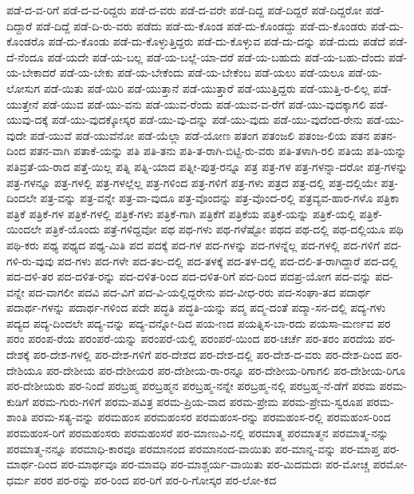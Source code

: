{ಪಡೆ-ದ-ವ-ರಿಗೆ
ಪಡೆ-ದ-ವ-ರಿದ್ದರು
ಪಡೆ-ದ-ವರು
ಪಡೆ-ದ-ವರೇ
ಪಡೆ-ದಿದ್ದ
ಪಡೆ-ದಿದ್ದರೆ
ಪಡೆ-ದಿದ್ದರೋ
ಪಡೆ-ದಿದ್ದಾರೆ
ಪಡೆ-ದಿದ್ದೆ
ಪಡೆ-ದಿ-ರು-ವರು
ಪಡೆದು
ಪಡೆ-ದು-ಕೊಂಡ
ಪಡೆ-ದು-ಕೊಂಡದ್ದು
ಪಡೆ-ದು-ಕೊಂಡರು
ಪಡೆ-ದು-ಕೊಂಡರೊ
ಪಡೆ-ದು-ಕೊಂಡು
ಪಡೆ-ದು-ಕೊಳ್ಳುತ್ತಿದ್ದರು
ಪಡೆ-ದು-ಕೊಳ್ಳುವ
ಪಡೆ-ದು-ದನ್ನು
ಪಡೆ-ದುದು
ಪಡೆದೆ
ಪಡೆ-ದೆ-ನೆಂದೂ
ಪಡೆ-ಯದೇ
ಪಡೆ-ಯ-ಬಲ್ಲ
ಪಡೆ-ಯ-ಬಲ್ಲೆ-ಯಾ-ದರೆ
ಪಡೆ-ಯ-ಬಹುದು
ಪಡೆ-ಯ-ಬಹು-ದೆಂದು
ಪಡೆ-ಯ-ಬೇಕಾದರೆ
ಪಡೆ-ಯ-ಬೇಕು
ಪಡೆ-ಯ-ಬೇಕೆಂದು
ಪಡೆ-ಯ-ಬೇಕೆಂಬ
ಪಡೆ-ಯಲು
ಪಡೆ-ಯಲೂ
ಪಡೆ-ಯ-ಲೋಸುಗ
ಪಡೆ-ಯಿತು
ಪಡೆ-ಯಿರಿ
ಪಡೆ-ಯುತ್ತಾನೆ
ಪಡೆ-ಯುತ್ತಾರೆ
ಪಡೆ-ಯುತ್ತಿದ್ದರು
ಪಡೆ-ಯುತ್ತಿ-ರ-ಲಿಲ್ಲ
ಪಡೆ-ಯುತ್ತೇನೆ
ಪಡೆ-ಯುವ
ಪಡೆ-ಯು-ವನು
ಪಡೆ-ಯುವ-ರೆಂದು
ಪಡೆ-ಯುವ-ವ-ರೆಗೆ
ಪಡೆ-ಯು-ವುದಕ್ಕಾಗಲಿ
ಪಡೆ-ಯುವು-ದಕ್ಕೆ
ಪಡೆ-ಯು-ವುದಕ್ಕೋಸ್ಕರ
ಪಡೆ-ಯು-ವು-ದನ್ನು
ಪಡೆ-ಯು-ವುದು
ಪಡೆ-ಯು-ವುದೆಂದ-ರೇನು
ಪಡೆ-ಯು-ವುದೇ
ಪಡೆ-ಯುವೆ
ಪಡೆ-ಯುವೆನೋ
ಪಡೆ-ಯೆಲ್ಲಾ
ಪಡೆ-ಯೋಣ
ಪತಂಗ
ಪತಂಜಲಿ
ಪತಂಜ-ಲಿಯ
ಪತನ
ಪತನ-ದಿಂದ
ಪತನ-ವಾಗಿ
ಪತಾಕೆ-ಯನ್ನು
ಪತಿ
ಪತಿ-ತನು
ಪತಿ-ತ-ರಾಗಿ-ಬಿಟ್ಟಿ-ರು-ವರು
ಪತಿ-ತಳಾಗಿ-ರಲಿ
ಪತಿಯ
ಪತಿ-ಯನ್ನು
ಪತಿವ್ರತೆ-ಯ-ರಾದ
ಪತ್ತೆ-ಯಿಲ್ಲ
ಪತ್ನಿ
ಪತ್ನಿ-ಯಾದ
ಪತ್ನೀ-ಪುತ್ರ-ರನ್ನೂ
ಪತ್ರ
ಪತ್ರ-ಗಳ
ಪತ್ರ-ಗಳನ್ನಾ-ದರೋ
ಪತ್ರ-ಗಳನ್ನು
ಪತ್ರ-ಗಳನ್ನೂ
ಪತ್ರ-ಗಳಲ್ಲಿ
ಪತ್ರ-ಗಳಲ್ಲೆಲ್ಲ
ಪತ್ರ-ಗಳಿಂದ
ಪತ್ರ-ಗಳಿಗೆ
ಪತ್ರ-ಗಳು
ಪತ್ರದ
ಪತ್ರ-ದಲ್ಲಿ
ಪತ್ರ-ದಲ್ಲಿಯೇ
ಪತ್ರ-ದಿಂದಲೇ
ಪತ್ರ-ವನ್ನು
ಪತ್ರ-ವನ್ನೇ
ಪತ್ರ-ವಾ-ವುದೂ
ಪತ್ರ-ವೊಂದನ್ನು
ಪತ್ರ-ವೊಂದ-ರಲ್ಲಿ
ಪತ್ರವ್ಯವ-ಹಾರ-ಗಳೊ
ಪತ್ರಿಕಾ
ಪತ್ರಿಕೆ
ಪತ್ರಿಕೆ-ಗಳ
ಪತ್ರಿಕೆ-ಗಳಲ್ಲಿ
ಪತ್ರಿಕೆ-ಗಳು
ಪತ್ರಿಕೆ-ಗಾಗಿ
ಪತ್ರಿಕೆಗೆ
ಪತ್ರಿಕೆಯ
ಪತ್ರಿಕೆ-ಯನ್ನು
ಪತ್ರಿಕೆ-ಯಲ್ಲಿ
ಪತ್ರಿಕೆ-ಯಿಂದಲೇ
ಪತ್ರಿಕೆ-ಯೊಂದು
ಪತ್ರೆ-ಗಳಿದ್ದವೋ
ಪಥ
ಪಥ-ಗಳು
ಪಥ-ಗಳೆಷ್ಟೋ
ಪಥದ
ಪಥ-ದಲ್ಲಿ
ಪಥ-ದಲ್ಲಿಯೂ
ಪಥಿ
ಪಥಿ-ಕರು
ಪಥ್ಯ
ಪಥ್ಯದ
ಪಥ್ಯ-ಮಿತಿ
ಪದ
ಪದಕ್ಕೆ
ಪದ-ಗಳ
ಪದ-ಗಳನ್ನು
ಪದ-ಗಳನ್ನೆಲ್ಲ
ಪದ-ಗಳಲ್ಲಿ
ಪದ-ಗಳಿಗೆ
ಪದ-ಗಳಿ-ರು-ವುವು
ಪದ-ಗಳು
ಪದ-ಗಳೇ
ಪದ-ತಲ-ದಲ್ಲಿ
ಪದ-ತಳಕ್ಕೆ
ಪದ-ತಳ-ದಲ್ಲಿ
ಪದ-ದಲಿ-ತ-ರಾಗಿದ್ದಾರೆ
ಪದ-ದಲ್ಲಿ
ಪದ-ದಳಿ-ತರ
ಪದ-ದಳಿತ-ರನ್ನು
ಪದ-ದಳಿತ-ರಿಂದ
ಪದ-ದಳಿತ-ರಿಗೆ
ಪದ-ದಿಂದ
ಪದಪ್ರ-ಯೋಗ
ಪದ-ವನ್ನು
ಪದ-ವನ್ನೇ
ಪದ-ವಾಗಲೀ
ಪದವಿ
ಪದ-ವಿಗೆ
ಪದ-ವಿ-ಯಲ್ಲಿದ್ದರೇನು
ಪದ-ವೀಧ-ರರು
ಪದ-ಸಂಘಾ-ತದ
ಪದಾರ್ಥ
ಪದಾರ್ಥ-ಗಳನ್ನು
ಪದಾರ್ಥ-ಗಳಿಂದ
ಪದೇ
ಪದ್ಧತಿ
ಪದ್ಧತಿ-ಯನ್ನು
ಪದ್ಮ
ಪದ್ಮ-ದಂತೆ
ಪದ್ಮಾ-ಸನ-ದಲ್ಲಿ
ಪದ್ಯ-ಗಳು
ಪದ್ಯದ
ಪದ್ಯ-ದಿಂದಲೇ
ಪದ್ಯ-ವನ್ನು
ಪದ್ಯ-ವನ್ನೋ-ದಿದ
ಪಯ-ಣದ
ಪಯತ್ನಿಸ-ಬಾ-ರದು
ಪಯಸಾ-ಮರ್ಣವ
ಪರ
ಪರಂ
ಪರಂಪ-ರೆಯ
ಪರಂಪರೆ-ಯನ್ನು
ಪರಂಪರೆ-ಯಲ್ಲಿ
ಪರಂಪರೆ-ಯಿಂದ
ಪರ-ಚರ್ಚೆ
ಪರ-ತರಂ
ಪರದೆಯ
ಪರ-ದೇಶಕ್ಕೆ
ಪರ-ದೇಶ-ಗಳಲ್ಲಿ
ಪರ-ದೇಶ-ಗಳಿಗೆ
ಪರ-ದೇಶದ
ಪರ-ದೇಶ-ದಲ್ಲಿ
ಪರ-ದೇಶ-ದ-ವರು
ಪರ-ದೇಶ-ದಿಂದ
ಪರ-ದೇಶಿಯೂ
ಪರ-ದೇಶೀಯ
ಪರ-ದೇಶೀಯರ
ಪರ-ದೇಶೀಯ-ರಾ-ರನ್ನೂ
ಪರ-ದೇಶೀಯ-ರಿಗಾಗಲಿ
ಪರ-ದೇಶೀಯ-ರಿಗೂ
ಪರ-ದೇಶೀಯರು
ಪರ-ನಿಂದೆ
ಪರಬ್ರಹ್ಮ
ಪರಬ್ರಹ್ಮನ
ಪರಬ್ರಹ್ಮ-ನನ್ನೇ
ಪರಬ್ರಹ್ಮ-ನಲ್ಲಿ
ಪರಬ್ರಹ್ಮ-ನೆ-ಡೆಗೆ
ಪರಮ
ಪರಮ-ಕುಡಿಗೆ
ಪರಮ-ಗುರು-ಗಳಿಗೆ
ಪರಮ-ಪವಿತ್ರ
ಪರಮ-ಪ್ರಿಯ-ವಾದ
ಪರಮ-ಪ್ರೇಮ
ಪರಮ-ಪ್ರೇಮ-ಸ್ವರೂಪ
ಪರಮ-ಶಾಂತಿ
ಪರಮ-ಸತ್ಯ-ವನ್ನು
ಪರಮಹಂಸ
ಪರಮಹಂಸರ
ಪರಮಹಂಸ-ರನ್ನು
ಪರಮಹಂಸ-ರಲ್ಲಿ
ಪರಮಹಂಸ-ರಿಂದ
ಪರಮಹಂಸ-ರಿಗೆ
ಪರಮಹಂಸರು
ಪರಮಹಂಸರೆ
ಪರ-ಮಾಣುವಿ-ನಲ್ಲಿ
ಪರಮಾತ್ಮ
ಪರಮಾತ್ಮನ
ಪರಮಾತ್ಮ-ನನ್ನು
ಪರಮಾತ್ಮ-ನನ್ನೂ
ಪರಮಾಧಿ-ಕಾರವೂ
ಪರಮಾನಂದ
ಪರಮಾನಂದ-ವಾಯಿತು
ಪರ-ಮಾನ್ನ-ವನ್ನು
ಪರ-ಮಾಪ್ತ
ಪರ-ಮಾರ್ಥ-ದಿಂದ
ಪರ-ಮಾರ್ಥವೂ
ಪರ-ಮಾವಧಿ
ಪರ-ಮಾಶ್ಚರ್ಯ-ವಾಯಿತು
ಪರ-ಮಿದಮದಃ
ಪರ-ಮೋಚ್ಚ
ಪರಮೋ-ಧರ್ಮ
ಪರರ
ಪರ-ರನ್ನು
ಪರ-ರಿಂದ
ಪರ-ರಿಗೆ
ಪರ-ರಿ-ಗೋಸ್ಕರ
ಪರ-ಲೋ-ಕದ
}
